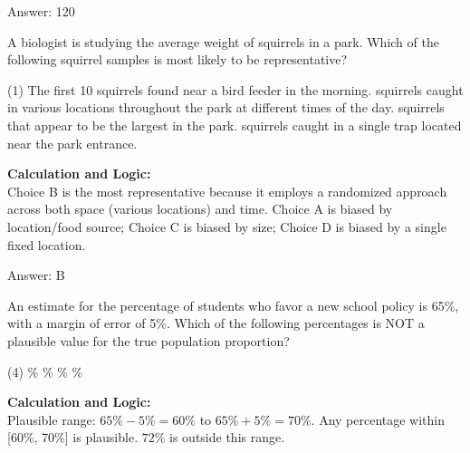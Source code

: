 \documentclass[11pt,paper=a4,answers]{exam}
\begin{document}
\begin{questions}
\begin{solution}
\vspace{30pt}

Answer: \colorbox{yellow!100}{120}
\end{solution}

\vspace{60pt}

\question
A biologist is studying the average weight of squirrels in a park. Which of the following squirrel samples is most likely to be representative?
\begin{tasks}(1)
    \task The first 10 squirrels found near a bird feeder in the morning.
     squirrels caught in various locations throughout the park at different times of the day.
     squirrels that appear to be the largest in the park.
     squirrels caught in a single trap located near the park entrance.
\end{tasks}

\begin{solution}
\textbf{Calculation and Logic:} \\
Choice B is the most representative because it employs a randomized approach across both space (various locations) and time. Choice A is biased by location/food source; Choice C is biased by size; Choice D is biased by a single fixed location.

\vspace{30pt}

Answer: \colorbox{yellow!100}{B}
\end{solution}

\vspace{60pt}

\question
An estimate for the percentage of students who favor a new school policy is 65\%, with a margin of error of 5\%. Which of the following percentages is NOT a plausible value for the true population proportion?
\begin{tasks}(4)
    \%
    \%
    \%
    \%
\end{tasks}

\begin{solution}
\textbf{Calculation and Logic:} \\
Plausible range: $65\% - 5\% = 60\%$ to $65\% + 5\% = 70\%$. Any percentage within [60\%, 70\%] is plausible. $72\%$ is outside this range.

\vspace{30pt}


\end{solution}
\end{questions}
\end{document}
